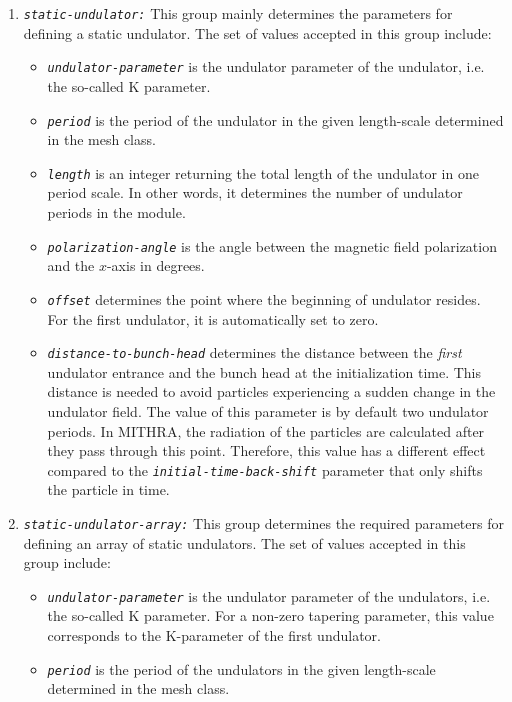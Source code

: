 \begin{enumerate}
%
\item {\tt \small \em static-undulator:} This group mainly determines the parameters for defining a static undulator. The set of values accepted in this group include:
%
\begin{itemize}
	\item {\tt \small \em undulator-parameter} is the undulator parameter of the undulator, i.e. the so-called K parameter.
	\item {\tt \small \em period} is the period of the undulator in the given length-scale determined in the mesh class.
	\item {\tt \small \em length} is an integer returning the total length of the undulator in one period scale. In other words, it determines the number of undulator periods in the module.
    \item {\tt \small \em polarization-angle} is the angle between the magnetic field polarization and the $x$-axis in degrees.
    \item {\tt \small \em offset} determines the point where the beginning of undulator resides. For the first undulator, it is automatically set to zero.
    \item {\tt \small \em distance-to-bunch-head} determines the distance between the {\em first} undulator entrance and the bunch head at the initialization time. This distance is needed to avoid particles experiencing a sudden change in the undulator field. The value of this parameter is by default two undulator periods. In MITHRA, the radiation of the particles are calculated after they pass through this point. Therefore, this value has a different effect compared to the {\tt \small \em initial-time-back-shift} parameter that only shifts the particle in time.
\end{itemize}
%
\item {\tt \small \em static-undulator-array:} This group determines the required parameters for defining an array of static undulators. The set of values accepted in this group include:
%
\begin{itemize}
	\item {\tt \small \em undulator-parameter} is the undulator parameter of the undulators, i.e. the so-called K parameter. For a non-zero tapering parameter, this value corresponds to the K-parameter of the first undulator.
	\item {\tt \small \em period} is the period of the undulators in the given length-scale determined in the mesh class.

\end{itemize}
\end{enumerate}
